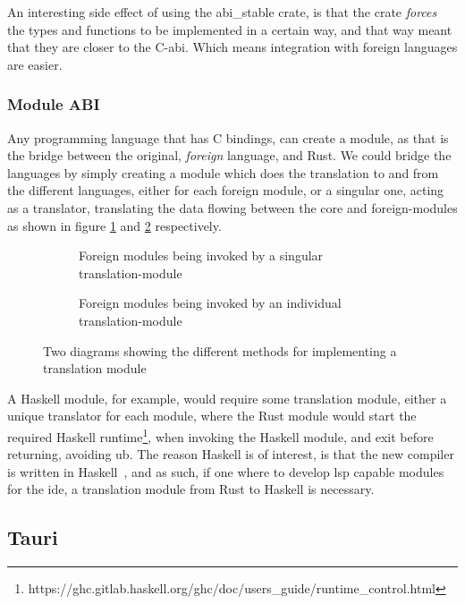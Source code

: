 An interesting side effect of using the abi\_stable crate, is that the crate
\textit{forces} the types and functions to be implemented in a certain way, and
that way meant that they are closer to the C-\gls*{abi}. Which means integration
with foreign languages are easier.


\subsubsection{Module ABI}

Any programming language that has C bindings, can create a module, as that is
the bridge between the original, \textit{foreign} language, and Rust. We could
bridge the languages by simply creating a module which does the translation to
and from the different languages, either for each foreign module, or a singular
one, acting as a translator, translating the data flowing between the core and
foreign-modules as shown in figure \ref{fig:fm1} and \ref{fig:fm2} respectively.

\begin{figure}[H]
  \begin{subfigure}[h]{0.49\linewidth}
    
    \caption{Foreign modules being invoked by a singular translation-module}
    \label{fig:fm1}
  \end{subfigure}
  \hfill
  \begin{subfigure}[h]{0.49\linewidth}
    
    \caption{Foreign modules being invoked by an individual translation-module}
    \label{fig:fm2}
  \end{subfigure}
  \caption{
    Two diagrams showing the different methods for implementing a translation
    module
  }
  \label{fig:fm}
\end{figure}

A Haskell module, for example, would require some translation module, either a
unique translator for each module, where the Rust module would start the
required Haskell runtime\footnote{https://ghc.gitlab.haskell.org/ghc/doc/users\_guide/runtime\_control.html},
when invoking the Haskell module, and exit before returning, avoiding \gls*{ub}.
The reason Haskell is of interest, is that the new compiler is written in
Haskell~\cite{wiig}, and as such, if one where to develop \gls*{lsp} capable
modules for the \gls*{ide}, a translation module from Rust to Haskell is necessary.


\subsection{Tauri}

